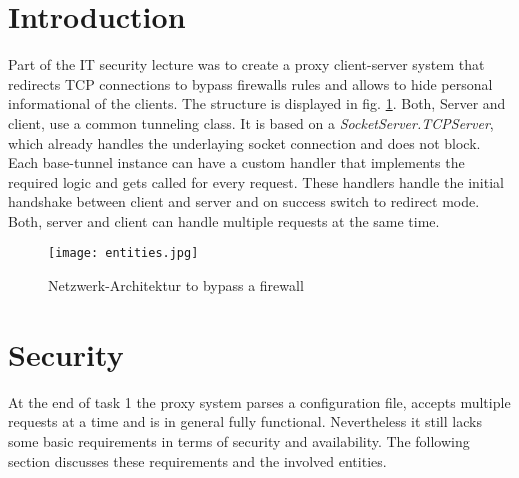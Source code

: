 \documentclass[12pt, a4paper]{scrartcl}
\begin{document}


\tableofcontents
\newpage
{}
\setcounter{lastroman}{\value{page}}

\pagestyle{plain}
\maketitle

\section{Introduction}
Part of the IT security lecture was to create a proxy client-server system that redirects TCP connections to bypass firewalls rules and allows to hide personal informational of the clients. The structure is displayed in fig. \ref{fig::arch}. \newline
Both, Server and client, use a common tunneling class. It is based on a \textit{SocketServer.TCPServer}, which already handles the underlaying socket connection and does not block. Each base-tunnel instance can have a custom handler that implements the required logic and gets called for every request. These handlers handle the initial handshake between client and server and on success switch to redirect mode. Both, server and client can handle multiple requests at the same time.

\begin{figure}[H]
    \centering
    \texttt{[image: entities.jpg]}
    \caption{Netzwerk-Architektur to bypass a firewall}
    \label{fig::arch}
\end{figure}

\newpage
\section{Security}
At the end of task 1 the proxy system parses a configuration file, accepts multiple requests at a time and is in general fully functional. Nevertheless it still lacks some basic requirements in terms of security and availability. The following section discusses these requirements and the involved entities.
\end{document}
